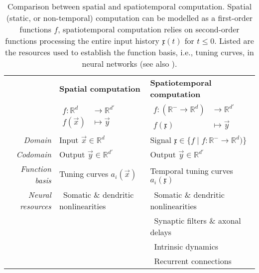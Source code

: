 \begin{table}[p]
	\small\sffamily
	\centering
	\caption[Comparison between spatial and spatiotemporal computation]{Comparison between spatial and spatiotemporal computation. Spatial (static, or non-temporal) computation can be modelled as a first-order functions $f$, spatiotemporal computation relies on second-order functions processing the entire input history $\mathfrak{x}(t)$ for $t \leq 0$.
	Listed are the resources used to establish the function basis, i.e., tuning curves, in neural networks (see also ).
	}
	\label{tbl:spatiotemporal}
	\begin{tabular}{r p{5.9cm} p{5.9cm}}
		\toprule
		& \textbf{Spatial computation} & \textbf{Spatiotemporal computation} \\
		\cmidrule(l){2-2}\cmidrule(l){3-3}
		&  $\begin{aligned} f: \mathbb{R}^d &\longrightarrow \mathbb{R}^{d'} \\ f(\vec x) &\mapsto \vec y \end{aligned}$ & $\begin{aligned} f : (\mathbb{R}^- \longrightarrow \mathbb{R}^d) &\longrightarrow \mathbb{R}^{d'} \\ f(\mathfrak{x}) &\mapsto \vec y\end{aligned}$ \\
		\cmidrule{1-1}\cmidrule(l){2-2}\cmidrule(l){3-3}
		\textit{Domain} & Input $\vec x \in \mathbb{R}^d$ & Signal $\mathfrak{x} \in \{ f \mid f : \mathbb{R}^- \longrightarrow \mathbb{R}^d) \}$ \\
		\cmidrule{1-1}\cmidrule(l){2-2}\cmidrule(l){3-3}
		\textit{Codomain} & Output $\vec y \in \mathbb{R}^{d'}$ & Output $\vec y \in \mathbb{R}^{d'}$ \\
		\cmidrule{1-1}\cmidrule(l){2-2}\cmidrule(l){3-3}
		\textit{Function basis} & Tuning curves $a_i(\vec x)$ & Temporal tuning curves $a_i(\mathfrak{x})$ \\
		\cmidrule{1-1}\cmidrule(l){2-2}\cmidrule(l){3-3}
		\textit{Neural resources}  & \textbullet\ Somatic \& dendritic nonlinearities & \textbullet\ Somatic \& dendritic nonlinearities \\
		                  & & \textbullet\ Synaptic filters \& axonal delays \\
		                  & & \textbullet\ Intrinsic dynamics \\
		                  & & \textbullet\ Recurrent connections \\
		\bottomrule
	\end{tabular}
\end{table}

